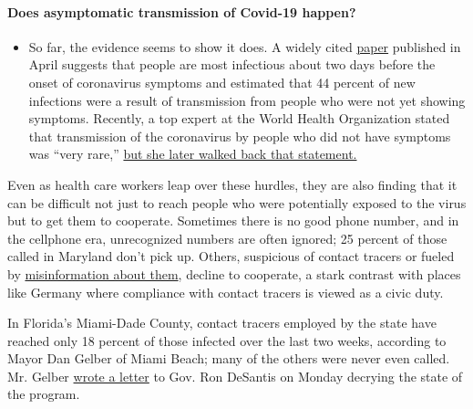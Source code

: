\begin{itemize}
{  \paragraph{Does asymptomatic transmission of Covid-19
  happen?}\label{does-asymptomatic-transmission-of-covid-19-happen}}

  \begin{itemize}
  \tightlist
  \item
    So far, the evidence seems to show it does. A widely cited
    \href{https://www.nature.com/articles/s41591-020-0869-5}{paper}
    published in April suggests that people are most infectious about
    two days before the onset of coronavirus symptoms and estimated that
    44 percent of new infections were a result of transmission from
    people who were not yet showing symptoms. Recently, a top expert at
    the World Health Organization stated that transmission of the
    coronavirus by people who did not have symptoms was ``very rare,''
    \href{https://www.nytimes.com/2020/06/09/world/coronavirus-updates.html?action=click\&pgtype=Article\&state=default\&region=MAIN_CONTENT_3\&context=storylines_faq\#link-1f302e21}{but
    she later walked back that statement.}
  \end{itemize}
\end{itemize}

Even as health care workers leap over these hurdles, they are also
finding that it can be difficult not just to reach people who were
potentially exposed to the virus but to get them to cooperate. Sometimes
there is no good phone number, and in the cellphone era, unrecognized
numbers are often ignored; 25 percent of those called in Maryland don't
pick up. Others, suspicious of contact tracers or fueled by
\href{https://www.npr.org/sections/health-shots/2020/07/14/890628203/conspiracy-theories-aside-heres-what-contact-tracers-really-do}{misinformation
about them}, decline to cooperate, a stark contrast with places like
Germany where compliance with contact tracers is viewed as a civic duty.

In Florida's Miami-Dade County, contact tracers employed by the state
have reached only 18 percent of those infected over the last two weeks,
according to Mayor Dan Gelber of Miami Beach; many of the others were
never even called. Mr. Gelber
\href{https://twitter.com/CBoomerVazquez/status/1287841499422629889?ref_src=twsrc\%5Etfw\%7Ctwcamp\%5Etweetembed\%7Ctwterm\%5E1287850787830468613\%7Ctwgr\%5E\&ref_url=https\%3A\%2F\%2Fwww.local10.com\%2Fnews\%2Flocal\%2F2020\%2F07\%2F27\%2Fcoronavirus-in-miami-dade-contact-tracing-failures-and-talk-of-how-to-spend-federal-money\%2F}{wrote
a letter} to Gov. Ron DeSantis on Monday decrying the state of the
program.


